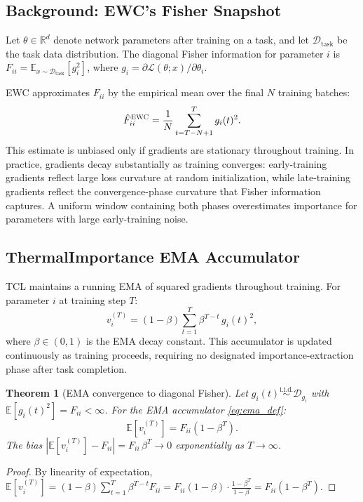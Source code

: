 \documentclass[10pt,letterpaper]{article}
\newtheorem{theorem}{Theorem}
\newcommand{\TCL}{\textsc{TCL}}
\newcommand{\EWC}{\textsc{EWC}}
\begin{document}
\subsection{Background: EWC's Fisher Snapshot}
\label{sec:ewc_background}

Let $\theta \in \mathbb{R}^d$ denote network parameters after training on a task,
and let $\mathcal{D}_{\mathrm{task}}$ be the task data distribution.
The diagonal Fisher information for parameter $i$ is
$F_{ii} = \mathbb{E}_{x \sim \mathcal{D}_{\mathrm{task}}}[g_i^2]$,
where $g_i = \partial\mathcal{L}(\theta; x)/\partial\theta_i$.

\EWC{} approximates $F_{ii}$ by the empirical mean over the final $N$ training batches:
\begin{equation}
  \hat{F}_{ii}^{\EWC} = \frac{1}{N}\sum_{t=T-N+1}^{T} g_i(t)^2.
  \label{eq:ewc_snapshot}
\end{equation}
This estimate is unbiased only if gradients are stationary throughout training.
In practice, gradients decay substantially as training converges: early-training
gradients reflect large loss curvature at random initialization, while late-training
gradients reflect the convergence-phase curvature that Fisher information captures.
A uniform window containing both phases overestimates importance for parameters
with large early-training noise.

\subsection{ThermalImportance EMA Accumulator}
\label{sec:thermal_importance}

\TCL{} maintains a running EMA of squared gradients throughout training.
For parameter $i$ at training step $T$:
\begin{equation}
  v_i^{(T)} = (1-\beta)\sum_{t=1}^{T}\beta^{T-t}\,g_i(t)^2,
  \label{eq:ema_def}
\end{equation}
where $\beta \in (0,1)$ is the EMA decay constant.
This accumulator is updated continuously as training proceeds, requiring no
designated importance-extraction phase after task completion.

\begin{theorem}[EMA convergence to diagonal Fisher]
\label{thm:ema_convergence}
Let $g_i(t) \stackrel{\mathrm{i.i.d.}}{\sim} \mathcal{D}_{g_i}$ with
$\mathbb{E}[g_i(t)^2] = F_{ii} < \infty$.
For the EMA accumulator \eqref{eq:ema_def}:
\begin{equation}
  \mathbb{E}[v_i^{(T)}] = F_{ii}(1 - \beta^T).
  \label{eq:bias}
\end{equation}
The bias $|\mathbb{E}[v_i^{(T)}] - F_{ii}| = F_{ii}\,\beta^T \to 0$ exponentially as $T \to \infty$.
\end{theorem}
\begin{proof}
By linearity of expectation,
$\mathbb{E}[v_i^{(T)}] = (1-\beta)\sum_{t=1}^T \beta^{T-t} F_{ii}
 = F_{ii}(1-\beta)\cdot\frac{1-\beta^T}{1-\beta} = F_{ii}(1-\beta^T)$.
\end{proof}
\end{document}
